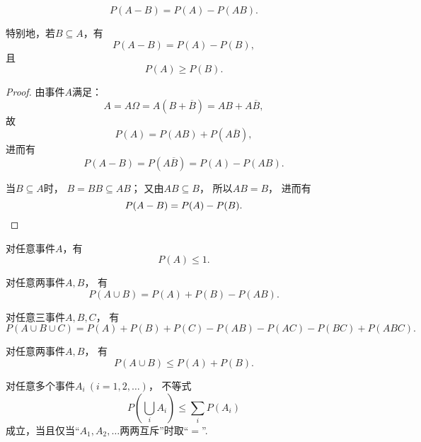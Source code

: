 \begin{property}[概率的减法]
\begin{equation}
P(A - B) = P(A) - P(AB).
\end{equation}

特别地，若\(B \subseteq A\)，有
\begin{equation}
P(A - B) = P(A) - P(B),
\end{equation}
且
\begin{equation}
P(A) \geq P(B).
\end{equation}

\begin{proof}
由事件\(A\)满足：\[
A = A \Omega
= A(B+\overline{B})
= AB+A\overline{B},
\]故\[
P(A) = P(AB)+P(A\overline{B}),
\]进而有\[
P(A-B) = P(A\overline{B}) = P(A) - P(AB).
\]

当\(B \subseteq A\)时，
\(B = BB \subseteq AB\)；
又由\(AB \subseteq B\)，
所以\(AB = B\)，
进而有\[
P(A-B) = P(A) - P(B).
\qedhere
\]
\end{proof}
\end{property}

\begin{property}
对任意事件\(A\)，有\begin{equation}
P(A) \leq 1.
\end{equation}
\end{property}

\begin{theorem}[概率的加法]
对任意两事件\(A,B\)，
有\begin{equation}
	P(A \cup B) = P(A) + P(B) - P(AB).
\end{equation}
\end{theorem}

\begin{corollary}
对任意三事件\(A,B,C\)，
有\begin{equation}
	P(A \cup B \cup C)
	= P(A) + P(B) + P(C)
	- P(AB) - P(AC) - P(BC)
	+ P(ABC).
\end{equation}
\end{corollary}

\begin{theorem}
对任意两事件\(A,B\)，
有\begin{equation}
	P(A \cup B) \leq P(A) + P(B).
\end{equation}
\end{theorem}

\begin{corollary}[布尔不等式]
对任意多个事件\(A_i\ (i=1,2,\dotsc)\)，
不等式\begin{equation}\label{equation:概率论基础.布尔不等式}
	P\left(\bigcup_i A_i\right)
	\leq
	\sum_i P(A_i)
\end{equation}
成立，当且仅当“\(A_1,A_2,\dotsc\)两两互斥”时取“\(=\)”.
\end{corollary}

